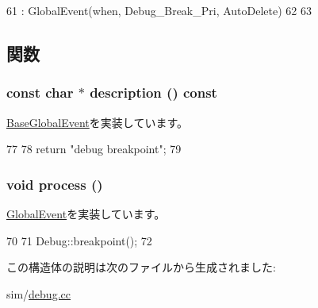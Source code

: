 \begin{DoxyCode}
61     : GlobalEvent(when, Debug_Break_Pri, AutoDelete)
62 {
63 }
\end{DoxyCode}


\subsection{関数}
\hypertarget{structDebugBreakEvent_a5a14fe478e2393ff51f02e9b7be27e00}{
\subsubsection[{description}]{\setlength{\rightskip}{0pt plus 5cm}const char $\ast$ description () const}}
\label{structDebugBreakEvent_a5a14fe478e2393ff51f02e9b7be27e00}


\hyperlink{classBaseGlobalEvent_aaf0ee88413e805ebda5569f5c13d847f}{BaseGlobalEvent}を実装しています。


\begin{DoxyCode}
77 {
78     return "debug breakpoint";
79 }
\end{DoxyCode}
\hypertarget{structDebugBreakEvent_a2e9c5136d19b1a95fc427e0852deab5c}{
\subsubsection[{process}]{\setlength{\rightskip}{0pt plus 5cm}void process ()}}
\label{structDebugBreakEvent_a2e9c5136d19b1a95fc427e0852deab5c}


\hyperlink{classGlobalEvent_a142b75b68a6291400e20fb0dd905b1c8}{GlobalEvent}を実装しています。


\begin{DoxyCode}
70 {
71     Debug::breakpoint();
72 }
\end{DoxyCode}


この構造体の説明は次のファイルから生成されました:\begin{DoxyCompactItemize}
\item 
sim/\hyperlink{sim_2debug_8cc}{debug.cc}\end{DoxyCompactItemize}
